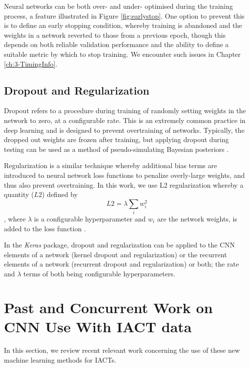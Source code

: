 Neural networks can be both over- and under- optimised during the training process, a feature illustrated in Figure \ref{fig:earlystop}. One option to prevent this is to define an early stopping condition, whereby training is abandoned and the weights in a network reverted to those from a previous epoch, though this depends on both reliable validation performance and the ability to define a suitable metric by which to stop training. We encounter such issues in Chapter \ref{ch:3-TimingInfo}.


\subsection{Dropout and Regularization}
Dropout refers to a procedure during training of randomly setting weights in the network to zero, at a configurable rate. This is an extremely common practice in deep learning and is designed to prevent overtraining of networks. Typically, the dropped out weights are frozen after training, but applying dropout during testing can be used as a method of pseudo-simulating Bayesian posteriors \cite{mike}\cite{gal2015}. 

Regularization is a similar technique whereby additional bias terms are introduced to neural network loss functions to penalize overly-large weights, and thus also prevent overtraining. In this work, we use L2 regularization whereby a quantity ($L2$) defined by
\begin{equation}
    L2=\lambda\sum_{i}w_i^2
\end{equation}
, where $\lambda$ is a configurable hyperparameter and $w_i$ are the network weights, is added to the loss function \cite{Keras}.

In the \textit{Keras} \cite{Keras} package, dropout and regularization can be applied to the CNN elements of a network (kernel dropout and regularization) or the recurrent elements of a network (recurrent dropout and regularization) or both; the rate and $\lambda$ terms of both being configurable hyperparameters.

\section{Past and Concurrent Work on CNN Use With IACT data}
In this section, we review recent relevant work concerning the use of these new machine learning methods for IACTs.

